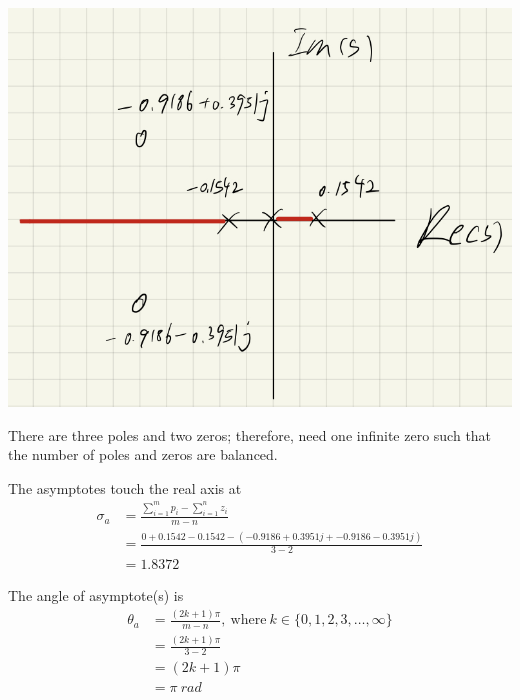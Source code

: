 \begin{questions}
\begin{solution}

   \begin{minipage}[htbp]{\linewidth}
      \centering
      \includegraphics[scale=0.67]{figures/real_axis_segments.png}
   \end{minipage}


   There are three poles and two zeros; therefore, need one infinite zero such that the number of poles and zeros are balanced.


   The asymptotes touch the real axis at
   \begin{equation*}
   \begin{split}
   \sigma_a &= \frac{\sum_{i=1}^{m} p_i - \sum_{i=1}^{n} z_i}{m-n} \\
   &= \frac{0 + 0.1542 - 0.1542 - (-0.9186 + 0.3951j + -0.9186 - 0.3951j)}{3-2} \\
   &= 1.8372
   \end{split}
   \end{equation*}

   The angle of asymptote(s) is
   \begin{equation*}
   \begin{split}
   \theta_a &= \frac{(2k+1)\pi}{m-n},\ \text{where}\ k \in \{0,1,2,3,\ldots,\infty\}\\
   &= \frac{(2k+1)\pi}{3-2} \\
   &= (2k+1)\pi \\
   &= \pi\ rad
   \end{split}
   \end{equation*}


\end{solution}
\end{questions}
